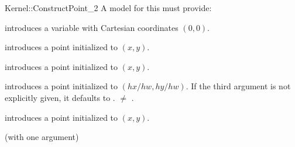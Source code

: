 \begin{ccRefFunctionObjectConcept}{Kernel::ConstructPoint_2}
A model for this must provide:


            {introduces a variable  with Cartesian coordinates
              $(0,0)$.}

\ccHidden{}
            {introduces a point  initialized to $(x,y)$.}

\ccHidden{}
            {introduces a point  initialized to $(x,y)$.}

\ccHidden{}
            {introduces a point  initialized to $(hx/hw,hy/hw)$.
             If the third argument is not explicitly given, it defaults
             to .
             \ccPrecond {} $\neq$ . }

\ccHidden{}
            {introduces a point  initialized to $(x,y)$.}

\ccRefines
{} (with one argument)

\ccSeeAlso
{} \\

\end{ccRefFunctionObjectConcept}
